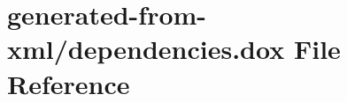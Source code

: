 \hypertarget{dependencies_8dox}{}\section{generated-\/from-\/xml/dependencies.dox File Reference}
\label{dependencies_8dox}
